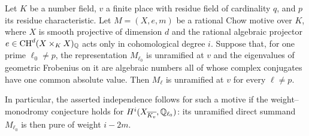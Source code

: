 \begin{proposition}
\label{c:chow-unramified-purity-reduction}
Let $K$ be a number field, $v$ a finite place with residue field of
cardinality $q$, and $p$ its residue characteristic.  Let
$M=(X,e,m)$ be a rational Chow motive over $K$, where $X$ is smooth
projective of dimension $d$ and the rational algebraic projector
$e\in\operatorname{CH}^d(X\times_KX)_{\mathbb Q}$ acts only in cohomological degree $i$.
Suppose that, for one prime $\ell_0\ne p$, the representation
$M_{\ell_0}$ is unramified at $v$ and the eigenvalues of geometric
Frobenius on it are algebraic numbers all of whose complex conjugates
have one common absolute value.  Then $M_\ell$ is unramified at $v$
for every $\ell\ne p$.

In particular, the asserted independence follows for such a motive if
the weight--monodromy conjecture holds for
$H^i(X_{\overline{K_v}},\mathbb Q_{\ell_0})$: its unramified direct summand
$M_{\ell_0}$ is then pure of weight $i-2m$.
\end{proposition}
